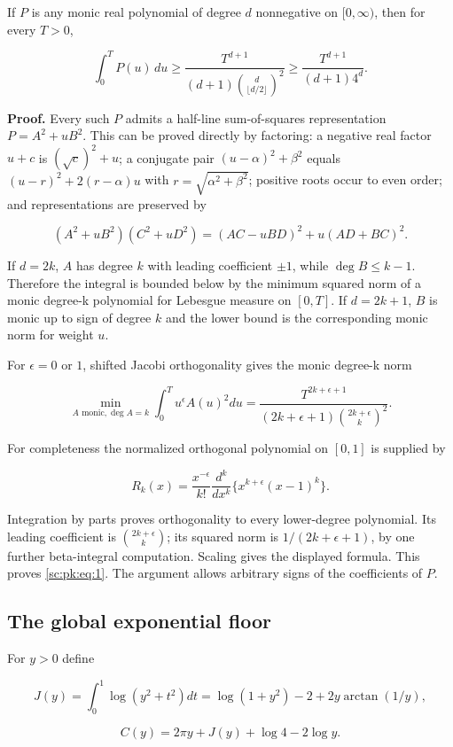 \documentclass[11pt,a4paper]{article}
\theoremstyle{definition}
\theoremstyle{remark}
\theoremstyle{plain}
\numberwithin{equation}{section}
\begin{document}
If $P$ is any monic real polynomial of degree $d$ nonnegative on $[0,\infty)$, then for every $T>0$,

\[
\int_0^T P(u)\,du
\ge
\frac{T^{d+1}}
{(d+1)\binom{d}{\lfloor d/2\rfloor}^2}
\ge\frac{T^{d+1}}{(d+1)4^d}.
\tag{PK.1}\label{sc:pk:eq:1}
\]

\textbf{Proof.} Every such $P$ admits a half-line sum-of-squares
representation $P=A^2+uB^2$. This can be proved directly by factoring: a
negative real factor $u+c$ is $(\sqrt c)^2+u$; a conjugate pair $(u-\alpha)^2+\beta^2$ equals $(u-r)^2+2(r-\alpha)u$ with $r=\sqrt{\alpha^2+\beta^2}$;
positive roots occur to even order; and representations are preserved by

\[
(A^2+uB^2)(C^2+uD^2)=(AC-uBD)^2+u(AD+BC)^2.
\]

If $d=2k$, $A$ has degree $k$ with leading coefficient $\pm1$, while $\deg B\le k-1$.
Therefore the integral is bounded below by the minimum squared norm of a
monic degree-k polynomial for Lebesgue measure on $[0,T]$. If $d=2k+1$, $B$ is monic up to sign of degree $k$ and the lower bound is the corresponding monic norm for weight $u$.

For $\epsilon=0$ or $1$, shifted Jacobi orthogonality gives the monic
degree-k norm

\[
\min_{A\text{ monic},\deg A=k}\int_0^T u^\epsilon A(u)^2du
=\frac{T^{2k+\epsilon+1}}
{(2k+\epsilon+1)\binom{2k+\epsilon}{k}^2}.
\]

For completeness the normalized orthogonal polynomial on $[0,1]$ is
supplied by

\[
R_k(x)=\frac{x^{-\epsilon}}{k!}
\frac{d^k}{dx^k}\{x^{k+\epsilon}(x-1)^k\}.
\]

Integration by parts proves orthogonality to every lower-degree
polynomial. Its leading coefficient is $\binom{2k+\epsilon}{k}$; its squared norm is $1/(2k+\epsilon+1)$, by one further beta-integral computation.
Scaling gives the displayed formula. This proves \eqref{sc:pk:eq:1}. The argument
allows arbitrary signs of the coefficients of $P$.

\subsection{The global exponential
floor}\label{sc:pk:the-global-exponential-floor}

For $y>0$ define

\[
J(y)=\int_0^1\log(y^2+t^2)dt
=\log(1+y^2)-2+2y\arctan(1/y),
\]

\[
C(y)=2\pi y+J(y)+\log4-2\log y.
\]
\end{document}
